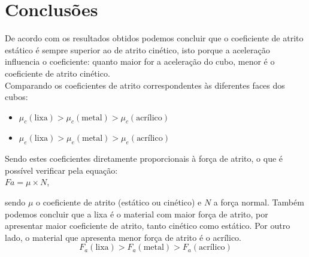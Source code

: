 \documentclass{article}
\begin{document}
	\section{Conclusões}
	
	De acordo com os resultados obtidos podemos concluir  que o coeficiente de atrito estático é sempre superior ao de atrito cinético, isto porque a aceleração influencia o coeficiente: quanto maior for a aceleração do cubo, menor é o coeficiente de atrito cinético.\\
	Comparando os coeficientes de atrito correspondentes às diferentes faces dos cubos: 
	\begin{itemize}
		\item $\mu_c(\text{lixa})>\mu_c(\text{metal})>\mu_c(\text{acrílico})$	
		\item $\mu_e(\text{lixa})>\mu_e(\text{metal})>\mu_e(\text{acrílico})$
	\end{itemize}
	
	Sendo estes coeficientes diretamente proporcionais à força de atrito, o que é possível verificar pela equação: \\
	$Fa = \mu \times N$,
	 
	sendo $\mu$ o coeficiente de atrito (estático ou cinético) e $N$ a força normal.
	Também podemos concluir que a lixa é o material com maior força de atrito, por apresentar maior coeficiente de atrito, tanto cinético como estático. Por outro lado, o material que apresenta menor força de atrito é o acrílico.
	$$F_a (\text{lixa}) > F_a (\text{metal}) > F_a (\text{acrílico})$$
	

	 
	 
\end{document}
